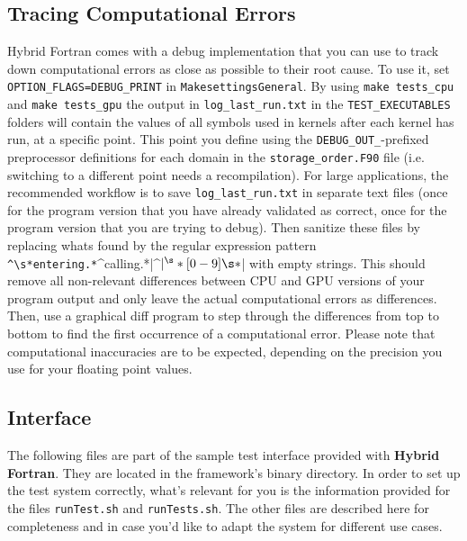 \subsection{Tracing Computational Errors} \label{sub:debugTracing}
Hybrid Fortran comes with a debug implementation that you can use to track down computational errors as close as possible to their root cause. To use it, set \verb|OPTION_FLAGS=DEBUG_PRINT| in \verb|MakesettingsGeneral|. By using \verb|make tests_cpu| and \verb|make tests_gpu| the output in \verb|log_last_run.txt| in the \verb|TEST_EXECUTABLES| folders will contain the values of all symbols used in kernels after each kernel has run, at a specific point. This point you define using the \verb|DEBUG_OUT_|-prefixed preprocessor definitions for each domain in the \verb|storage_order.F90| file (i.e. switching to a different point needs a recompilation). For large applications, the recommended workflow is to save \verb|log_last_run.txt| in separate text files (once for the program version that you have already validated as correct, once for the program version that you are trying to debug). Then sanitize these files by replacing whats found by the regular expression pattern \verb|^\s*entering.*|^\s*calling.*|^\s*$|^\s*[0-9]\s*$| with empty strings. This should remove all non-relevant differences between CPU and GPU versions of your program output and only leave the actual computational errors as differences. Then, use a graphical diff program to step through the differences from top to bottom to find the first occurrence of a computational error. Please note that computational inaccuracies are to be expected, depending on the precision you use for your floating point values.

\subsection{Interface} \label{sub:testInterface}
The following files are part of the sample test interface provided with \textbf{Hybrid Fortran}. They are located in the framework's binary directory. In order to set up the test system correctly, what's relevant for you is the information provided for the files \verb|runTest.sh| and \verb|runTests.sh|. The other files are described here for completeness and in case you'd like to adapt the system for different use cases.

